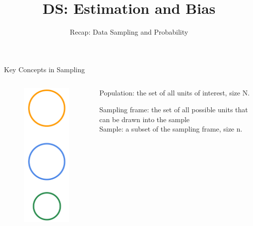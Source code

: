 \documentclass[aspectratio=169]{../latex_main/tntbeamer}  %
\title[Introduction]{DS: Estimation and Bias}
\subtitle{Recap: Data Sampling and Probability}
\begin{document}
	
	\maketitle
	\begin{frame}{Key Concepts in Sampling}
	    \begin{columns}
	        \begin{column}{.4\textwidth}
	           \begin{figure}
	               \includegraphics[scale=.4]{Bild2}
	           \end{figure}
	        \end{column}
	        
	        \begin{column}{.4\textwidth}
	            
	            Population: the set of all units of interest, size N.\\
	            \bigskip
	            \bigskip
	            \bigskip
	            \bigskip
	            \bigskip
	        
	            Sampling frame: the set of all possible units that can be drawn into the sample\\
	            \bigskip
	            \bigskip
	            Sample: a subset of the sampling frame, size n.
	        \end{column}
	        
	    \end{columns}
	    
	\end{frame}
	
\end{document}
